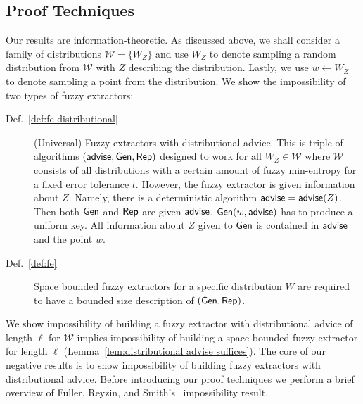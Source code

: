 \subsection{Proof Techniques}
Our results are information-theoretic. As discussed above, we shall
consider a family of distributions $\mathcal{W} = \{ W_Z \}$ and use $W_Z$ to
denote sampling a random distribution from $\mathcal{W}$ with $Z$
describing the distribution.  Lastly, we use $w\leftarrow W_Z$ to
denote sampling a point from the distribution.  We show the
impossibility of two types of fuzzy extractors:
\begin{description}
\item[Def.~\ref{def:fe distributional}] (Universal) Fuzzy extractors with distributional advice.  This is triple of algorithms $({\mathsf{advise}}, {\mathsf{Gen}}, {\mathsf{Rep}})$ designed to work for all $W_Z \in \mathcal{W}$ where $\mathcal{W}$ consists of all distributions with a certain amount of fuzzy min-entropy for a fixed error tolerance $t$.  However, the fuzzy extractor is given information about $Z$.  Namely, there is a deterministic algorithm ${\mathsf{advise}} = {\mathsf{advise}}(Z)$. Then both ${\mathsf{Gen}}$ and ${\mathsf{Rep}}$ are given ${\mathsf{advise}}$. ${\mathsf{Gen}}(w, {\mathsf{advise}})$ has to produce a uniform key.  All information about $Z$ given to ${\mathsf{Gen}}$ is contained in ${\mathsf{advise}}$ and the point $w$. 
\item[Def.~\ref{def:fe}] Space bounded fuzzy extractors for a specific distribution $W$ are required to have a bounded size description of $({\mathsf{Gen}}, {\mathsf{Rep}})$.
\end{description}

We show impossibility of building a fuzzy extractor with distributional advice of length $\ell$ for $\mathcal{W}$ implies impossibility of building a space bounded fuzzy extractor for length $\ell$ (Lemma~\ref{lem:distributional advise suffices}). 
The core of our negative results is to show impossibility of building fuzzy extractors with distributional advice.   Before introducing our proof techniques we perform a brief overview of Fuller, Reyzin, and Smith's~\cite{fuller2020fuzzy} impossibility result.

